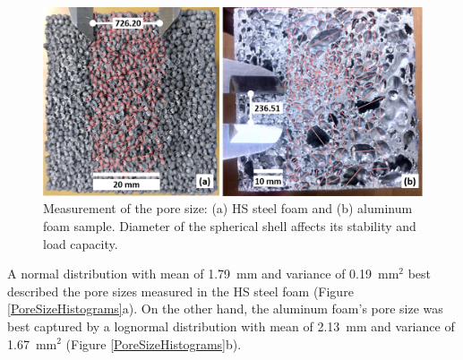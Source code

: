 \documentclass[review]{elsarticle}
\begin{document}
\begin{figure}[htbp]
	\begin{center}
		\includegraphics[width=0.80\linewidth]{Tex-Figures/Fig02a_b.png}
		\caption{Measurement of the pore size: (a) HS steel foam and (b) aluminum foam sample. Diameter of the spherical shell affects its stability and load capacity.}
		\label{PoreMeas}
	\end{center}
\end{figure}

A normal distribution with mean of 1.79~mm and variance of 0.19~mm$^2$ best described the pore sizes measured in the HS steel foam (Figure \ref{PoreSizeHistograms}a). On the other hand, the aluminum foam's pore size was best captured by a lognormal distribution with mean of 2.13~mm and variance of 1.67~mm$^2$ (Figure \ref{PoreSizeHistograms}b).
\end{document}
